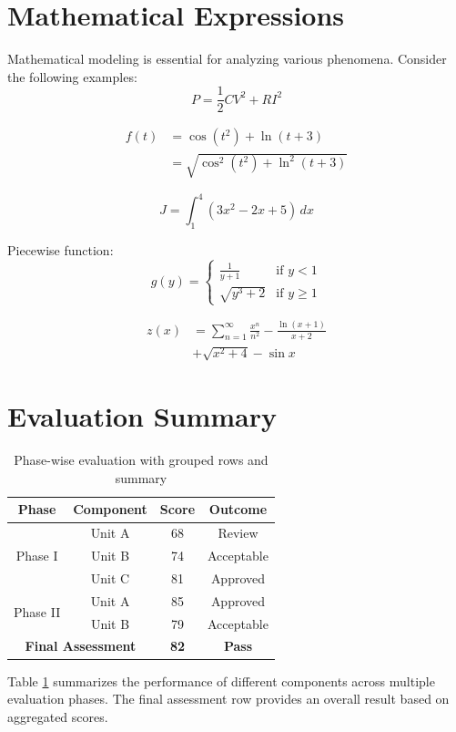 \documentclass{article}
\begin{document}
\section{Mathematical Expressions}
Mathematical modeling is essential for analyzing various phenomena. Consider the following examples:
\begin{equation}
    P = \frac{1}{2} CV^2 + RI^2
\end{equation}

\begin{equation}
\begin{split}
    f(t) &= \cos(t^2) + \ln(t+3) \\
         &= \sqrt{\cos^2(t^2) + \ln^2(t+3)}
\end{split}
\end{equation}

\begin{equation*}
    J = \int_1^4(3x^2 -2x +5)\, dx
\end{equation*}

Piecewise function:
\begin{equation*}
    g(y) = 
    \begin{cases}
        \frac{1}{y+1} & \text{if } y<1 \\
        \sqrt{y^3+2} & \text{if } y \ge 1
    \end{cases}
\end{equation*}

\begin{align}
    z(x) &= \sum_{n=1}^{\infty} \frac{x^n}{n^2} - \frac{\ln(x+1)}{x+2} \nonumber \\ 
         &+ \sqrt{x^2+4} -\sin x
\end{align}
\clearpage

\section{Evaluation Summary}
\begin{table}[h!]

    \centering
    \begin{tabular}{|c|c|c|c|}
        \hline
        \textbf{Phase} & \textbf{Component} & \textbf{Score} & \textbf{Outcome} \\
        \hline
        \multirow{3}{*}{Phase I} & Unit A & 68 & Review \\ \cline{4-4}
         & Unit B & 74 & Acceptable \\ \cline{2-2}
         & Unit C & 81 & Approved \\
        \hline
        \multirow{2}{*}{Phase II} & Unit A & 85 & Approved \\ \cline{3-3}
         & Unit B & 79 & Acceptable \\
        \hline
        \multicolumn{2}{|c|}{\textbf{Final Assessment}} & \textbf{82} & \textbf{Pass} \\
        \hline
    \end{tabular}
    \caption{Phase-wise evaluation with grouped rows and summary}
    \label{tab:esum}
\end{table}
Table \ref{tab:esum} summarizes the performance of different components across multiple evaluation phases. The final assessment row provides an overall result based on aggregated scores.
\clearpage
\end{document}
